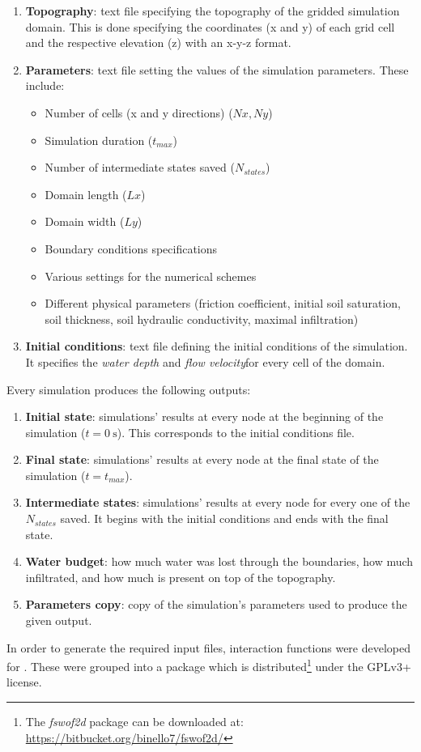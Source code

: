 \begin{enumerate}
\itemsep0em
  \item \textbf{Topography}: text file specifying the topography of the gridded simulation domain. This is done specifying the coordinates (x and y) of each grid cell and the respective elevation (z) with an x-y-z format.
  \item \textbf{Parameters}: text file setting the values of the simulation parameters. These include:
  \begin{itemize}
    \itemsep0em
    \item Number of cells (x and y directions) ($Nx, Ny$)
    \item Simulation duration ($t_{max}$)
    \item Number of intermediate states saved ($N_{states}$)
    \item Domain length ($Lx$)
    \item Domain width ($Ly$)
    \item Boundary conditions specifications
    \item Various settings for the numerical schemes
    \item Different physical parameters (friction coefficient, initial soil saturation, soil thickness, soil hydraulic conductivity, maximal infiltration)
\end{itemize}
  \item \textbf{Initial conditions}: text file defining the initial conditions of the simulation. It specifies the \emph{water depth} and \emph{flow velocity}for every cell of the domain.
\end{enumerate}

\noindent Every simulation produces the following outputs:

\begin{enumerate}
\itemsep0em
  \item \textbf{Initial state}: simulations' results at every node at the beginning of the simulation ($t = \SI{0}{\s}$). This corresponds to the initial conditions file.
  \item \textbf{Final state}: simulations' results at every node at the final state of the simulation ($t = t_{max}$).
  \item \textbf{Intermediate states}: simulations' results at every node for every one of the $N_{states}$ saved. It begins with the initial conditions and ends with the final state.
  \item \textbf{Water budget}: how much water was lost through the boundaries, how much infiltrated, and how much is present on top of the topography.
  \item \textbf{Parameters copy}: copy of the simulation's parameters used to produce the given output.
\end{enumerate}


\noindent In order to generate the required input files, interaction functions were developed for . These were grouped into a package which is distributed\footnote{The \emph{fswof2d} package can be downloaded at: \url{https://bitbucket.org/binello7/fswof2d/}} under the GPLv3+ license.



